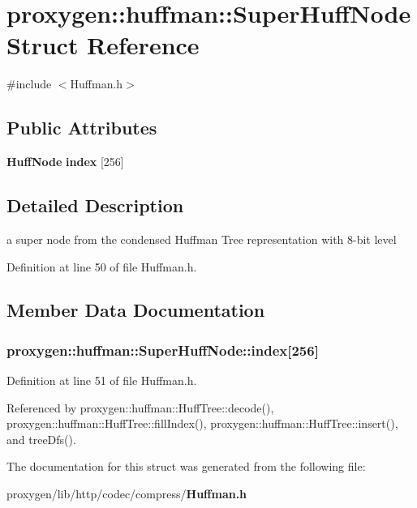 \section{proxygen\+:\+:huffman\+:\+:Super\+Huff\+Node Struct Reference}
\label{structproxygen_1_1huffman_1_1SuperHuffNode}


{\ttfamily \#include $<$Huffman.\+h$>$}

\subsection*{Public Attributes}
\begin{DoxyCompactItemize}
\item 
{\bf Huff\+Node} {\bf index} [256]
\end{DoxyCompactItemize}


\subsection{Detailed Description}
a super node from the condensed Huffman Tree representation with 8-\/bit level 

Definition at line 50 of file Huffman.\+h.



\subsection{Member Data Documentation}
\subsubsection[{index}]{ proxygen\+::huffman\+::\+Super\+Huff\+Node\+::index[256]}\label{structproxygen_1_1huffman_1_1SuperHuffNode_ae9cfa01aaff501779c2702f38df0dd4a}


Definition at line 51 of file Huffman.\+h.



Referenced by proxygen\+::huffman\+::\+Huff\+Tree\+::decode(), proxygen\+::huffman\+::\+Huff\+Tree\+::fill\+Index(), proxygen\+::huffman\+::\+Huff\+Tree\+::insert(), and tree\+Dfs().



The documentation for this struct was generated from the following file\+:\begin{DoxyCompactItemize}
\item 
proxygen/lib/http/codec/compress/{\bf Huffman.\+h}\end{DoxyCompactItemize}

